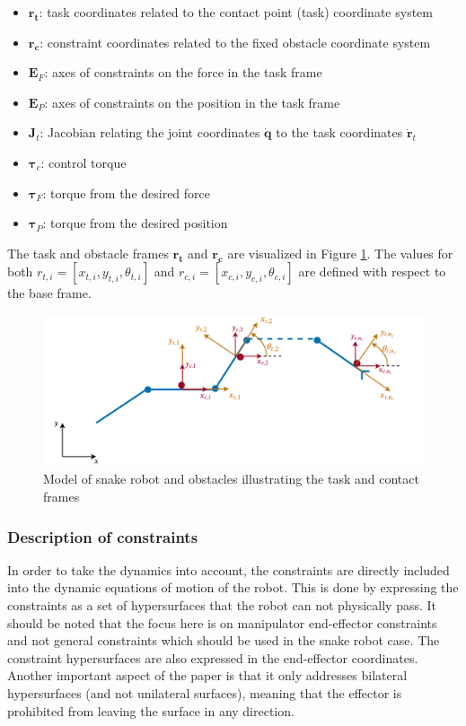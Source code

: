 \begin{itemize}
    \item $\mathbf{r_t}$: task coordinates related to the contact point (task) coordinate system
    \item $\mathbf{r_c}$: constraint coordinates related to the fixed obstacle coordinate system
    \item $\mathbf{E}_F$: axes of constraints on the force in the task frame
    \item $\mathbf{E}_P$: axes of constraints on the position in the task frame
    \item $\mathbf{J}_t$: Jacobian relating the joint coordinates $\dot{\mathbf{q}}$ to the task coordinates $\dot{\mathbf{r}}_t$
    \item $\boldsymbol{\tau}_c$: control torque
    \item $\boldsymbol{\tau}_F$: torque from the desired force
    \item $\boldsymbol{\tau}_P$: torque from the desired position
\end{itemize}

The task and obstacle frames $\mathbf{r_t}$ and $\mathbf{r_c}$ are visualized in Figure \ref{fig:rt-rc}. The values for both $r_{t,i} = [x_{t,i}, y_{t,i}, \theta_{t,i}]$ and $r_{c,i} = [x_{c,i}, y_{c,i}, \theta_{c,i}]$ are defined with respect to the base frame.

\begin{figure}
    \centering
    \includegraphics[width=\textwidth]{figures/theory/rt-rc.pdf}
    \caption{Model of snake robot and obstacles illustrating the task and contact frames}
    \label{fig:rt-rc}
\end{figure}


\subsubsection{Description of constraints}

In order to take the dynamics into account, the constraints are directly included into the dynamic equations of motion of the robot. This is done by expressing the constraints as a set of hypersurfaces that the robot can not physically pass. It should be noted that the focus here is on manipulator end-effector constraints and not general constraints which should be used in the snake robot case. The constraint hypersurfaces are also expressed in the end-effector coordinates. Another important aspect of the paper is that it only addresses bilateral hypersurfaces (and not unilateral surfaces), meaning that the effector is prohibited from leaving the surface in any direction.

